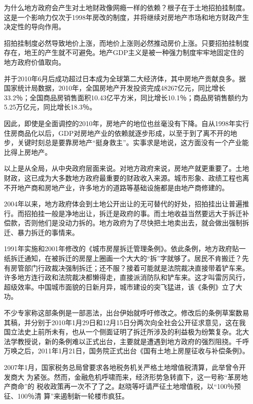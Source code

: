 为什么地方政府会产生对土地财政像网瘾一样的依赖？根子在于土地招拍挂制度。这是一个影响力仅次于1998年房改的制度，并将继续对房地产市场和地方财政产生决定性的导向作用。

招拍挂制度必然导致地价上涨，而地价上涨则必然推动房价上涨。只要招拍挂制度存在，地王的产生就不可避免。地产GDP主义是被一种强力制度牢牢地固定住的地方政府价值取向。

并于2010年6月后成功超过日本成为全球第二大经济体，其中房地产贡献良多。据国家统计局数据，2010年，全国房地产开发投资完成48267亿元，同比增长33.2％；全国商品房销售面积10.43亿平方米，同比增长10.1％；商品房销售额约为5.25万亿元，同比增长18.3％。

因此，即使是全面调控的2010年，房地产的地位也丝毫没有下降。自从1998年实行住房商品化以后，GDP对房地产业的依赖就逐步形成，以至于到了离不开的地步，关键时刻总是要靠房地产“挺身救主”。实事求是地说，这方面没有一个产业能比得上房地产。

以上是从全局，从中央政府层面来说。对地方政府来说，房地产就更重要了。土地财政，这已成为大多数地方政府最重要的财政收入来源。城市形象、政绩工程也离不开地产商和房地产业，许多地方的道路等基础设施都是由地产商修建的。

2004年以来，地方政府体会到土地公开出让的无可替代的好处，招拍挂出让普遍推行。而招拍挂一般是净地出让，拆迁是政府的事。而土地收益当然要远大于拆迁补偿款，否则他们是没动力拆的。地方政府为了尽快把土地卖出去，就会做出强制拆迁、暴力拆迁的事情来。


1991年实施和2001年修改的《城市房屋拆迁管理条例》。依此条例，地方政府贴一纸拆迁通知，在被拆迁的房屋上圈画一个大大的“拆”字就够了。居民不肯搬迁？先有房管部门行政裁决强制拆迁；还不服？接着可能就是法院裁决直接带着铲车来。许多地方连行政和法院裁决都懒得走，直接派消防队和铲车来。这才叫雷厉风行，超级效率。中国城市面貌的日新月异，城市建设的突飞猛进，该《条例》立了大功。

不少专家称这部条例是一部恶法，出台伊始就呼吁修改之。修改后的条例草案数易其稿，并分别于2010年1月29日和12月15日分两次向全社会公开征求意见，这在我国立法史上前所未有，也从一个侧面证明了拆迁所涉及的利益极为纷繁复杂。北大法学教授说，新的条例难以正式出台，主要就是遭遇到地方政府的强烈阻挠。千呼万唤之后，2011年1月21日，国务院正式出台《国有土地上房屋征收与补偿条例》。



2007年1月，国家税务总局曾要求各地税务机关严格土地增值税清算，此举曾令开发商大
为紧张。然而，金融危机呼啸而来，经济形势急转直下，这一号称“革房地产商命”的
税收政策再一次不了了之。赵晓等吁请严征土地增值税，以“100％预征、100％清
算”来遏制新一轮楼市疯狂。


